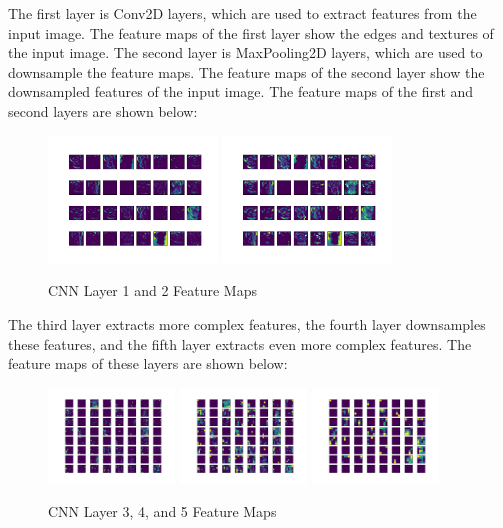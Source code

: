 \documentclass[12pt]{article}
\begin{document}
The first layer is Conv2D layers, which are used to extract features from the input image. 
The feature maps of the first layer show the edges and textures of the input image.
The second layer is MaxPooling2D layers, which are used to downsample the feature maps. 
The feature maps of the second layer show the downsampled features of the input image.
The feature maps of the first and second layers are shown below:
\begin{figure}[H]
    \centering
    \includegraphics[width=0.4\textwidth]{./src/cnn_layer_1.png}
    \includegraphics[width=0.4\textwidth]{./src/cnn_layer_2.png}
    \caption{CNN Layer 1 and 2 Feature Maps}
\end{figure}
The third layer extracts more complex features, the fourth layer downsamples these features, and the fifth layer extracts even more complex features. 
The feature maps of these layers are shown below:
\begin{figure}[H]
    \centering
    \includegraphics[width=0.3\textwidth]{./src/cnn_layer_3.png}
    \includegraphics[width=0.3\textwidth]{./src/cnn_layer_4.png}
    \includegraphics[width=0.3\textwidth]{./src/cnn_layer_5.png}
    \caption{CNN Layer 3, 4, and 5 Feature Maps}
\end{figure}
\end{document}
